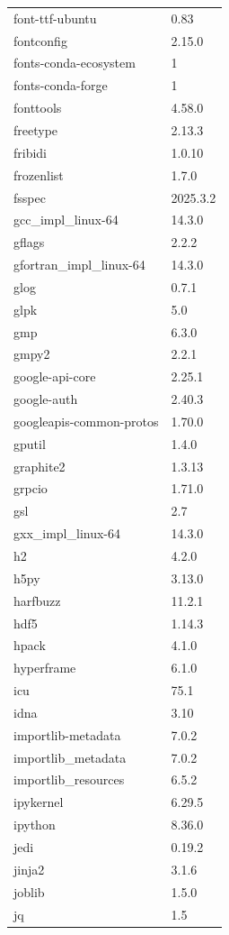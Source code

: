 \begin{longtable}{ll}
    font-ttf-ubuntu&0.83 \\
    fontconfig&2.15.0 \\
    fonts-conda-ecosystem&1 \\
    fonts-conda-forge&1 \\
    fonttools&4.58.0 \\
    freetype&2.13.3 \\
    fribidi&1.0.10 \\
    frozenlist&1.7.0 \\
    fsspec&2025.3.2 \\
    gcc\_impl\_linux-64&14.3.0 \\
    gflags&2.2.2 \\
    gfortran\_impl\_linux-64&14.3.0 \\
    glog&0.7.1 \\
    glpk&5.0 \\
    gmp&6.3.0 \\
    gmpy2&2.2.1 \\
    google-api-core&2.25.1 \\
    google-auth&2.40.3 \\
    googleapis-common-protos&1.70.0 \\
    gputil&1.4.0 \\
    graphite2&1.3.13 \\
    grpcio&1.71.0 \\
    gsl&2.7 \\
    gxx\_impl\_linux-64&14.3.0 \\
    h2&4.2.0 \\
    h5py&3.13.0 \\
    harfbuzz&11.2.1 \\
    hdf5&1.14.3 \\
    hpack&4.1.0 \\
    hyperframe&6.1.0 \\
    icu&75.1 \\
    idna&3.10 \\
    importlib-metadata&7.0.2 \\
    importlib\_metadata&7.0.2 \\
    importlib\_resources&6.5.2 \\
    ipykernel&6.29.5 \\
    ipython&8.36.0 \\
    jedi&0.19.2 \\
    jinja2&3.1.6 \\
    joblib&1.5.0 \\
    jq&1.5 \\

\end{longtable}
